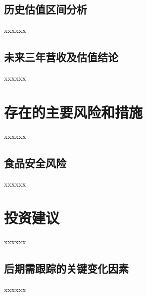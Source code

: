 \documentclass[a4paper,12pt,lang=cn,fontset = windows]{elegantpaper} %
\begin{document}
\subsection{历史估值区间分析}
xxxxxx
\subsection{未来三年营收及估值结论}
xxxxxx
\section{存在的主要风险和措施}
xxxxxx
\subsection{食品安全风险}
xxxxxx
\section{投资建议}
xxxxxx
\subsection{后期需跟踪的关键变化因素} %
xxxxxx
\end{document}
